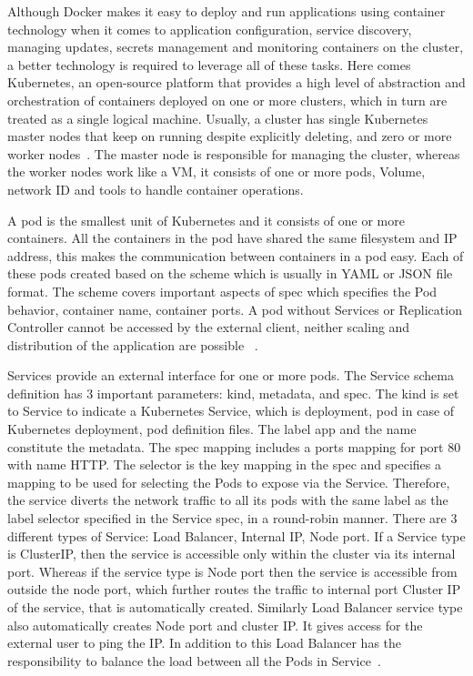 Although Docker makes it easy to deploy and run applications using
container technology when it comes to application configuration,
service discovery, managing updates, secrets management and monitoring
containers on the cluster, a better technology is required to leverage
all of these tasks. Here comes Kubernetes, an open-source platform
that provides a high level of abstraction and orchestration of
containers deployed on one or more clusters, which in turn are treated
as a single logical machine. Usually, a cluster has single Kubernetes
master nodes that keep on running despite explicitly deleting, and
zero or more worker nodes~\cite{hid-sp18-602-kubernetes}. The master
node is responsible for managing the cluster, whereas the worker nodes
work like a VM, it consists of one or more pods, Volume, network ID
and tools to handle container operations.

A pod is the smallest unit of Kubernetes and it consists of one or
more containers. All the containers in the pod have shared the same
filesystem and IP address, this makes the communication between
containers in a pod easy. Each of these pods created based on the
scheme which is usually in YAML or JSON file format. The scheme covers
important aspects of spec which specifies the Pod behavior, container
name, container ports. A pod without Services or Replication
Controller cannot be accessed by the external client, neither scaling
and distribution of the application are possible
~\cite{hid-sp18-602-pods}.

Services provide an external interface for one or more pods. The
Service schema definition has 3 important parameters: kind, metadata,
and spec. The kind is set to Service to indicate a Kubernetes Service,
which is deployment, pod in case of Kubernetes deployment, pod
definition files. The label app and the name constitute the
metadata. The spec mapping includes a ports mapping for port 80 with
name HTTP. The selector is the key mapping in the spec and specifies a
mapping to be used for selecting the Pods to expose via the
Service. Therefore, the service diverts the network traffic to all its
pods with the same label as the label selector specified in the
Service spec, in a round-robin manner. There are 3 different types of
Service: Load Balancer, Internal IP, Node port. If a Service type is
ClusterIP, then the service is accessible only within the cluster via
its internal port. Whereas if the service type is Node port then the
service is accessible from outside the node port, which further routes
the traffic to internal port Cluster IP of the service, that is
automatically created. Similarly Load Balancer service type also
automatically creates Node port and cluster IP. It gives access for
the external user to ping the IP. In addition to this Load Balancer
has the responsibility to balance the load between all the Pods in
Service~\cite{hid-sp18-602-services}.

